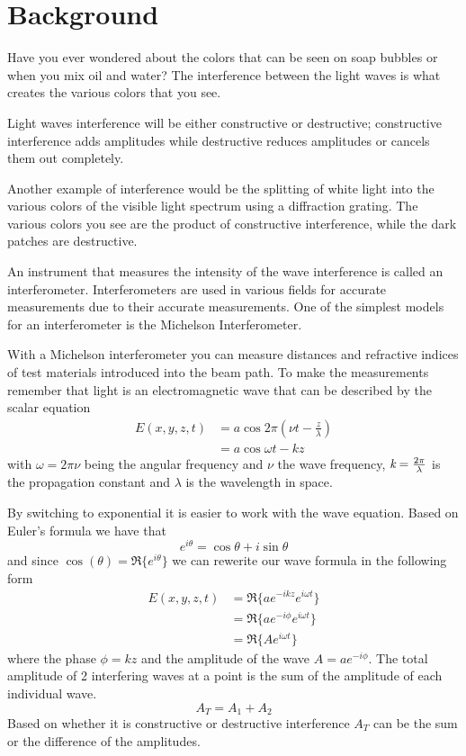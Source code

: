 \clearpage
\section{Background}
	Have you ever wondered about the colors that can be seen on soap bubbles or when you mix oil and water? The interference between the light waves is what creates the various colors  that you see.

	Light waves interference will be either constructive or destructive; constructive interference adds amplitudes while destructive reduces amplitudes or cancels them out completely.

	Another example of interference would be the splitting of white light into the various colors of the visible light spectrum using a diffraction grating. The various colors you see are the product of constructive interference, while the dark patches are destructive.

    An instrument that measures the intensity of the wave interference is called an interferometer. Interferometers are used in various fields for accurate measurements due to their accurate measurements. One of the simplest models for an interferometer is the Michelson Interferometer.

	With a Michelson interferometer you can measure distances and refractive indices of test materials introduced into the beam path. To make the measurements remember that light is an electromagnetic wave that can be described by the scalar equation
	\begin{align}\label{eqn:EMWave}
		\nonumber E(x,y,z,t) &= a\cos{2\pi(\nu t-\frac{z}{\lambda})} \\
		&= a\cos{\omega t-kz}
	\end{align}
with $\omega=2\pi\nu$ being the angular frequency and $\nu$ the wave frequency, $\emph{k}=\frac{2\pi}{\lambda}$ is the propagation constant and $\lambda$ is the wavelength in space.  

	By switching to exponential it is easier to work with the wave equation. Based on Euler’s formula we have that 
	\begin{equation}\label{eqn:Euler's}
		e^{i\theta} = \cos{\theta} + i \sin{\theta}
	\end{equation}
and since $\cos(\theta)=\Re\{e^{i\theta}\}$ we can rewerite our wave formula in the following form
	\begin{align}\label{eqn:TrigEMWave}
		\nonumber E(x,y,z,t) &=\Re\{a e^{-ikz} e^{i\omega t}\} \\
		\nonumber &=\Re\{a e^{-i\phi} e^{i\omega t}\} \\
		&=\Re\{A e^{i\omega t}\}
	\end{align}
where the phase $\phi=kz$ and the amplitude of the wave $A=ae^{-i\phi}$. The total amplitude of 2 interfering waves at a point is the sum of the amplitude of each individual wave.
	\begin{equation}\label{eqn:Amplitude}
		A_{T}=A_{1}+A_{2}
	\end{equation}
Based on whether it is constructive or destructive interference $A_T$ can be the sum or the difference of the amplitudes. 

